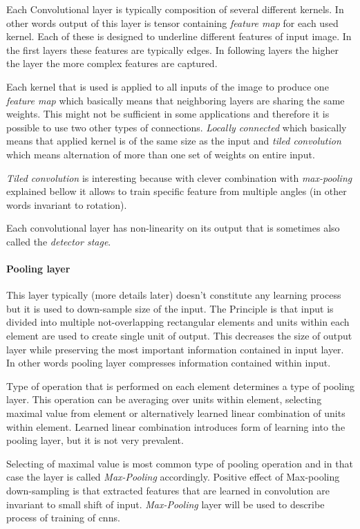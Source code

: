 \documentclass[11pt]{article}
\begin{document}
Each Convolutional layer is typically composition of several different kernels. In other words output of this layer is tensor containing \emph{feature map} for each used kernel. Each of these is designed to underline different features of input image. In the first layers these features are typically edges. In following layers the higher the layer the more complex features are captured.

Each kernel that is used is applied to all inputs of the image to produce one \emph{feature map} which basically means that neighboring layers are sharing the same weights. This might not be sufficient in some applications and therefore it is possible to use two other types of connections. \emph{Locally connected} which basically means that applied kernel is of the same size as the input and \emph{tiled convolution} which means alternation of more than one set of weights on entire input.

\emph{Tiled convolution} is interesting because with clever combination with \emph{max-pooling} explained bellow it allows to train specific feature from multiple angles (in other words invariant to rotation).

Each convolutional layer has non-linearity on its output that is sometimes also called the \emph{detector stage}.

\paragraph{Pooling layer}
\label{sec:orgbfe2c97}

This layer typically (more details later) doesn't constitute any learning process but it is used to down-sample size of the input. The Principle is that input is divided into multiple not-overlapping rectangular elements and units within each element are used to create single unit of output. This decreases the size of output layer while preserving the most important information contained in input layer. In other words pooling layer compresses information contained within input.

Type of operation that is performed on each element determines a type of pooling layer. This operation can be averaging over units within element, selecting maximal value from element or alternatively learned linear combination of units within element. Learned linear combination introduces form of learning into the pooling layer, but it is not very prevalent.

Selecting of maximal value is most common type of pooling operation and in that case the layer is called \emph{Max-Pooling} accordingly. Positive effect of Max-pooling down-sampling is that extracted features that are learned in convolution are invariant to small shift of input. \emph{Max-Pooling} layer will be used to describe process of training of \glspl{cnn}.
\end{document}
